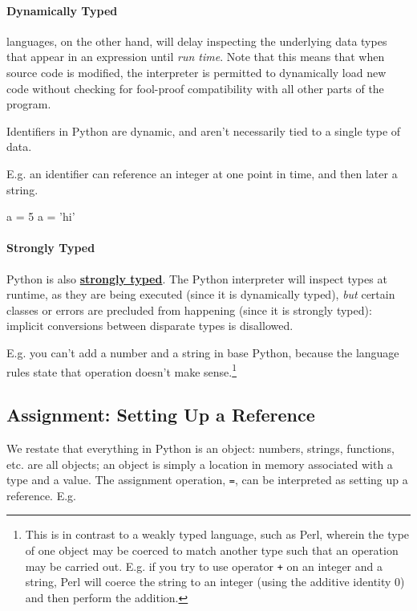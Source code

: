 \documentclass[12pt,letterpaper,twoside]{article}
\begin{document}
\begin{enumerate}
\paragraph{Dynamically Typed} languages, on the other hand, 
will delay inspecting the underlying data types that appear in an expression until \emph{run time}. Note that this means that when source code is modified,
the interpreter is permitted to dynamically load new code without checking for fool-proof compatibility with all other parts of the program.

Identifiers in Python are dynamic, and aren't necessarily tied to a single type of data.

E.g. an identifier can reference an
integer at one point in time, and then later a string.

\begin{python}
a = 5
a = 'hi'
\end{python}

\vspace{-3ex}
\paragraph{Strongly Typed} Python is also
\href{https://en.wikipedia.org/wiki/Strong_and_weak_typing#Definitions_of_%22strong%22_or_%22weak%22}{\textbf{strongly typed}}.
The Python interpreter will inspect types at runtime, as they are being
executed (since it is dynamically typed), \emph{but} certain classes or errors are precluded from happening (since it is strongly typed):
implicit conversions between disparate types is disallowed.
  
E.g. you can't add a number and a string in base Python, because the language rules state that operation doesn't make sense.\footnote{This is in contrast to a weakly typed language, such as Perl, wherein the type of one object may be coerced to match another type such that an operation may be carried out. E.g. if you try to use operator \texttt{+} on an integer and a string, Perl will coerce the string to an integer (using the additive identity 0) and then perform the addition.}

\subsection{Assignment: Setting Up a Reference}
\vspace{-1ex}
We restate that everything in Python is an object: numbers, strings, functions, etc. are all objects;
an object is simply a location in memory associated with a type and a value.
The assignment operation, \texttt{=}, can be interpreted as setting up a
reference. E.g.


\end{enumerate}
\end{document}
